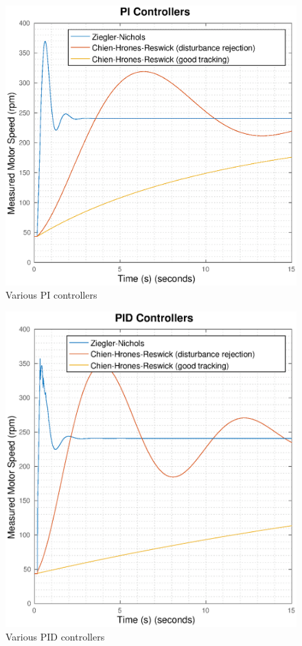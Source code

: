 \begin{figure}[h]
    \centering
    \includegraphics[width=\imagewidth]{images/Tt_PT1_PI}
    \caption{Various PI controllers}
    \label{fig:Tt_PT1_PI}
\end{figure}

\begin{figure}[h]
    \centering
    \includegraphics[width=\imagewidth]{images/Tt_PT1_PID}
    \caption{Various PID controllers}
    \label{fig:Tt_PT1_PID}
\end{figure}

